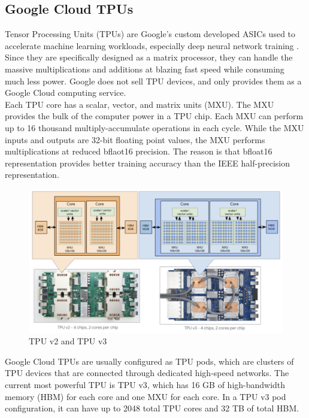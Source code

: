 \documentclass[conference]{IEEEtran}
\begin{document}
	\subsection{Google Cloud TPUs}
	Tensor Processing Units (TPUs) are Google's custom developed ASICs used to accelerate machine learning workloads, especially deep neural network training \cite{TPU-1}. Since they are specifically designed as a matrix processor, they can handle the massive multiplications and additions at blazing fast speed while consuming much less power. Google does not sell TPU devices, and only provides them as a Google Cloud computing service.\\
	
	Each TPU core has a scalar, vector, and matrix units (MXU). The MXU provides the bulk of the computer power in a TPU chip. Each MXU can perform up to 16 thousand multiply-accumulate operations in each cycle. While the MXU inputs and outputs are 32-bit floating point values, the MXU performs multiplications at reduced bflaot16 precision. The reason is that bfloat16 representation provides better training accuracy than the IEEE half-precision representation. \cite{TPU-2}\\
	
	\begin{figure}[!htbp]
		\centering
		\includegraphics[scale=0.3]{figures/figure5.png}
		\caption{\label{fig:my-label} TPU v2 and TPU v3 \cite{TPU-1}}
	\end{figure}
	
	Google Cloud TPUs are usually configured as TPU pods, which are clusters of TPU devices that are connected through dedicated high-speed networks. The current most powerful TPU is TPU v3, which has 16 GB of high-bandwidth memory (HBM) for each core and one MXU for each core. In a TPU v3 pod configuration, it can have up to 2048 total TPU cores and 32 TB of total HBM.\\
	
\end{document}
